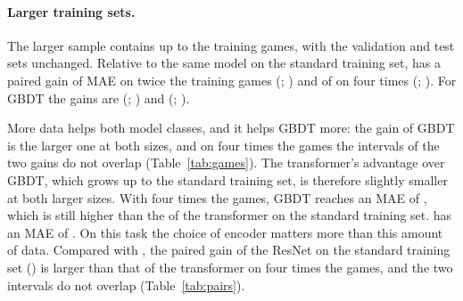 \documentclass[11pt]{article}
\begin{document}
\paragraph{Larger training sets.}
The larger sample contains up to  the training games,
with the validation and test sets unchanged. Relative to the same model on
the standard training set,  has a paired gain of
 MAE on
twice the training games
(;
) and of
 on
four times
(;
).
For GBDT the gains are 
(;
) and
(;
).

More data helps both model classes, and it helps GBDT more: the gain of GBDT
is the larger one at both sizes, and on four times the games the intervals of
the two gains do not overlap (Table~\ref{tab:games}). The transformer's
advantage over GBDT, which grows up to the standard training set, is
therefore slightly smaller at both larger sizes. With four times the games,
GBDT reaches an MAE of , which is still
higher than the  of the transformer on
the standard training set.  has an MAE
of .
\ifchangeconv
On this task the choice of encoder matters more than this amount of data.
Compared with , the paired gain of the ResNet on
the standard training set
() is larger than that
of the transformer on four times the games, and the two intervals do not
overlap (Table~\ref{tab:pairs}).
\fi
\end{document}
